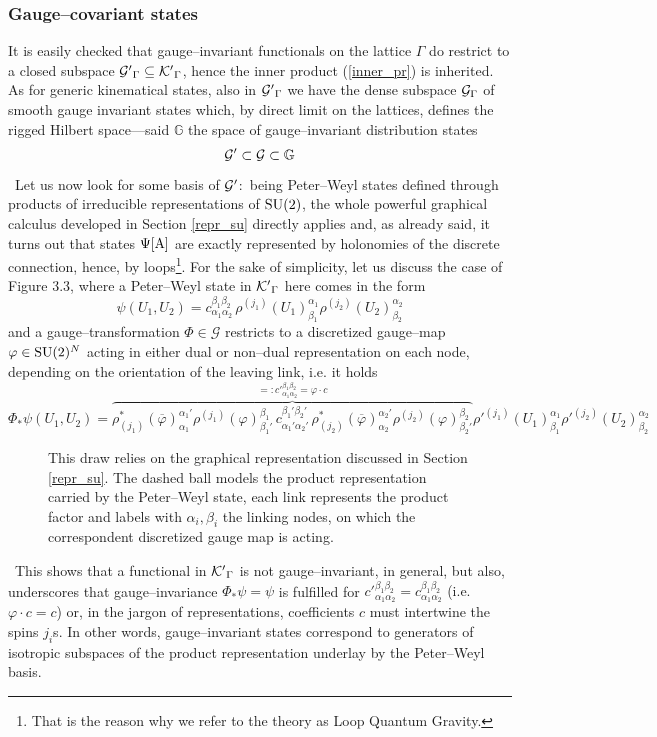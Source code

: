 \subsubsection{Gauge--covariant states}
It is easily checked that gauge--invariant functionals on the lattice $\Gamma$ do restrict to a closed subspace ${\mathcal{G}'}_\Gamma\subseteq{\mathcal{K}'}_\Gamma$, hence the inner product (\ref{inner_pr}) is inherited. As for generic kinematical states, also in ${\mathcal{G}'}_\Gamma$ we have the dense subspace $\mathcal{G}_\Gamma$ of smooth gauge invariant states which, by direct limit on the lattices, defines the rigged Hilbert space---said $\mathbb{G}$ the space of gauge--invariant distribution states
$$\mathcal{G}'\subset{\mathcal{G}}\subset\mathbb{G}$$
\,\newline
Let us now look for some basis of $\mathcal{G}'$:\, being Peter--Weyl states defined through products of irreducible representations of $\text{\normalfont SU}(2)$, the whole powerful graphical calculus developed in Section \ref{repr_su} directly applies and, as already said, it turns out that states $\Psi[\text{\normalfont A}]$ are exactly represented by holonomies of the discrete connection, hence, by loops\footnote{That is the reason why we refer to the theory as Loop Quantum Gravity.}. For the sake of simplicity, let us discuss the case of Figure 3.3, where a Peter--Weyl state in ${\mathcal{K}'}_\Gamma$ here comes in the form%
$$\psi(U_1,U_2)=c^{\beta_1\beta_2}_{\alpha_1\alpha_2}\,\rho^{(j_1)}(U_1)^{\alpha_1}_{\beta_1}\rho^{(j_2)}(U_2)^{\alpha_2}_{\beta_2}$$
and a gauge--transformation $\Phi\in\mathscr{G}$ restricts to a discretized gauge--map $\varphi\in\text{\normalfont SU}(2)^N$ acting in either dual or non--dual representation on each node, depending on the orientation of the leaving link, i.e. it holds
$$\Phi_*\psi(U_1,U_2)=\overbrace{\rho^*_{(j_1)}(\overline{\varphi})^{{\alpha_1}'}_{\alpha_1}\rho^{(j_1)}(\varphi)^{\beta_1}_{{\beta_1}'}\,c^{{\beta_1}'{\beta_2}'}_{{\alpha_1}'{\alpha_2}'}\,\rho^*_{(j_2)}(\overline{\varphi})^{{\alpha_2}'}_{\alpha_2}\rho^{(j_2)}(\varphi)^{\beta_2}_{{\beta_2}'}}^{=:{c'}^{\beta_1\beta_2}_{\alpha_1\alpha_2}=\varphi\cdot c}{\rho'}^{(j_1)}(U_1)^{\alpha_1}_{\beta_1}{\rho'}^{(j_2)}(U_2)^{\alpha_2}_{\beta_2}$$

\begin{figure}[ht]
    \centering
    
    \caption{This draw relies on the graphical representation discussed in Section \ref{repr_su}. The dashed ball models the product representation carried by the Peter--Weyl state, each link represents the product factor and labels with $\alpha_i,\beta_i$ the linking nodes, on which the correspondent discretized gauge map is acting.}
\end{figure}
\,\newline
This shows that a functional in ${\mathcal{K}'}_\Gamma$ is not gauge--invariant, in general, but also, underscores that gauge--invariance $\Phi_*\psi=\psi$ is fulfilled for ${c'}^{\beta_1\beta_2}_{\alpha_1\alpha_2}=c^{\beta_1\beta_2}_{\alpha_1\alpha_2}$ {(i.e. $\varphi\cdot c=c$)} or, in the jargon of representations, coefficients $c$ must intertwine the spins ${j_i}$s. In other words, gauge--invariant states correspond to generators of isotropic subspaces of the product representation underlay by the Peter--Weyl basis.

